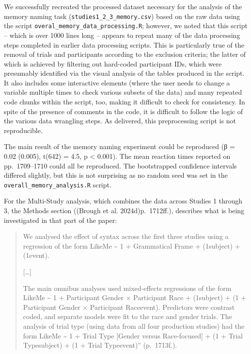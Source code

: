 \documentclass[
  letterpaper,
  DIV=11,
  numbers=noendperiod]{scrartcl}
\begin{document}
We successfully recreated the processed dataset necessary for the
analysis of the memory naming task (\texttt{studies1\_2\_3\_memory.csv})
based on the raw data using the script
\texttt{overal\_memory\_data\_processing.R}; however, we noted that this
script -- which is over 1000 lines long -- appears to repeat many of the
data processing steps completed in earlier data processing scripts. This
is particularly true of the removal of trials and participants according
to the exclusion criteria; the latter of which is achieved by filtering
out hard-coded participant IDs, which were presumably identified via the
visual analysis of the tables produced in the script. It also includes
some interactive elements (where the user needs to change a variable
multiple times to check various subsets of the data) and many repeated
code chunks within the script, too, making it difficult to check for
consistency. In spite of the presence of comments in the code, it is
difficult to follow the logic of the various data wrangling steps. As
delivered, this preprocessing script is not reproducible.

The main result of the memory naming experiment could be reproduced (β =
0.02 (0.005), t(642) = 4.5, p \textless{} 0.001). The mean reaction
times reported on pp.~1709--1710 could all be reproduced. The
bootstrapped confidence intervals differed slightly, but this is not
surprising as no random seed was set in the
\texttt{overall\_memory\_analysis.R} script.

For the Multi-Study analysis, which combines the data across Studies 1
through 3, the Methods section ((Brough et al. 2024d)p.~1712ff.),
describes what is being investigated in that part of the paper:~

\begin{quote}
We analysed the effect of syntax across the first three studies using a
regression of the form LikeMe \textasciitilde{} 1 + Grammatical Frame +
(1\textbar subject) + (1\textbar event).

{[}\ldots{]}

The main omnibus analyses used mixed-effects regressions of the form
LikeMe \textasciitilde{} 1 + Participant Gender × Participant Race +
(1\textbar subject) + (1 + Participant Gender × Participant
Race\textbar event). Predictors were contrast coded, and separate models
were fit to the race and gender trials. The analysis of trial type
(using data from all four production studies) had the form LikeMe
\textasciitilde{} 1 + Trial Type {[}Gender versus Race-focused{]} + (1 +
Trial Type\textbar subject) + (1 + Trial Type\textbar event)''
(p.~1713f.).
\end{quote}
\end{document}
